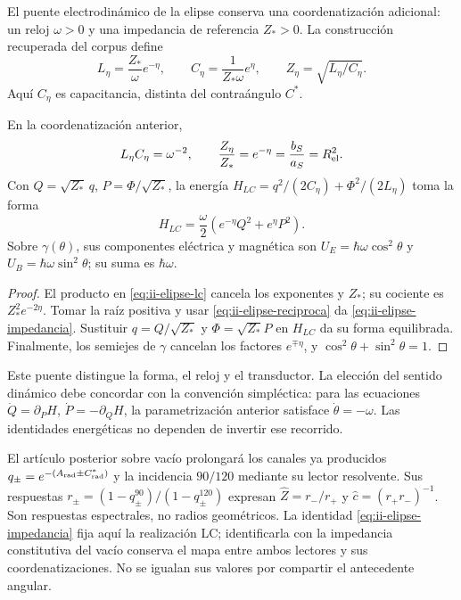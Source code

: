 El puente electrodinámico de la elipse conserva una coordenatización adicional:
un reloj \(\omega>0\) y una impedancia de referencia \(Z_*>0\).
La construcción recuperada del corpus define
\begin{equation}
 L_\eta=\frac{Z_*}{\omega}e^{-\eta},\qquad
 C_\eta=\frac{1}{Z_*\omega}e^\eta,
 \qquad Z_\eta=\sqrt{L_\eta/C_\eta}.
 \label{eq:ii-elipse-lc}
\end{equation}
Aquí \(C_\eta\) es capacitancia, distinta del contraángulo \(C^*\).
\begin{proposition}
\label{prop:ii-elipse-lc}
En la coordenatización anterior,
\begin{equation}
 L_\eta C_\eta=\omega^{-2},\qquad
 \frac{Z_\eta}{Z_*}=e^{-\eta}
 =\frac{b_S}{a_S}=R_{\rm el}^{2}.
 \label{eq:ii-elipse-impedancia}
\end{equation}
Con \(Q=\sqrt{Z_*}\,q\), \(P=\Phi/\sqrt{Z_*}\), la energía
\(H_{LC}=q^2/(2C_\eta)+\Phi^2/(2L_\eta)\) toma la forma
\[
 H_{LC}=\frac\omega2(e^{-\eta}Q^2+e^\eta P^2).
\]
Sobre \(\gamma(\theta)\), sus componentes eléctrica y magnética son
\(U_E=\hbar\omega\cos^2\theta\) y
\(U_B=\hbar\omega\sin^2\theta\); su suma es \(\hbar\omega\).
\end{proposition}
\begin{proof}
El producto en \eqref{eq:ii-elipse-lc} cancela los exponentes y
\(Z_*\); su cociente es \(Z_*^2e^{-2\eta}\). Tomar la raíz
positiva y usar \eqref{eq:ii-elipse-reciproca} da
\eqref{eq:ii-elipse-impedancia}. Sustituir \(q=Q/\sqrt{Z_*}\)
y \(\Phi=\sqrt{Z_*}P\) en \(H_{LC}\) da su forma equilibrada.
Finalmente, los semiejes de \(\gamma\) cancelan los factores
\(e^{\mp\eta}\), y \(\cos^2\theta+\sin^2\theta=1\).
\end{proof}

Este puente distingue la forma, el reloj y el transductor. La elección
del sentido dinámico debe concordar con la convención simpléctica: para
las ecuaciones \(\dot Q=\partial_PH\),
\(\dot P=-\partial_QH\), la parametrización anterior satisface
\(\dot\theta=-\omega\). Las identidades energéticas no dependen
de invertir ese recorrido.

El artículo posterior sobre vacío prolongará los canales ya producidos
\(q_\pm=e^{-(A_{\rm rad}\pm C^*_{\rm rad})}\) y la incidencia
\(90/120\) mediante su lector resolvente. Sus respuestas
\(r_\pm=(1-q_\pm^{90})/(1-q_\pm^{120})\) expresan
\(\widehat Z=r_-/r_+\) y \(\widehat c=(r_+r_-)^{-1}\).
Son respuestas espectrales, no radios geométricos. La identidad
\eqref{eq:ii-elipse-impedancia} fija aquí la realización LC;
identificarla con la impedancia constitutiva del vacío conserva el mapa
entre ambos lectores y sus coordenatizaciones. No se igualan sus valores por compartir
el antecedente angular.
